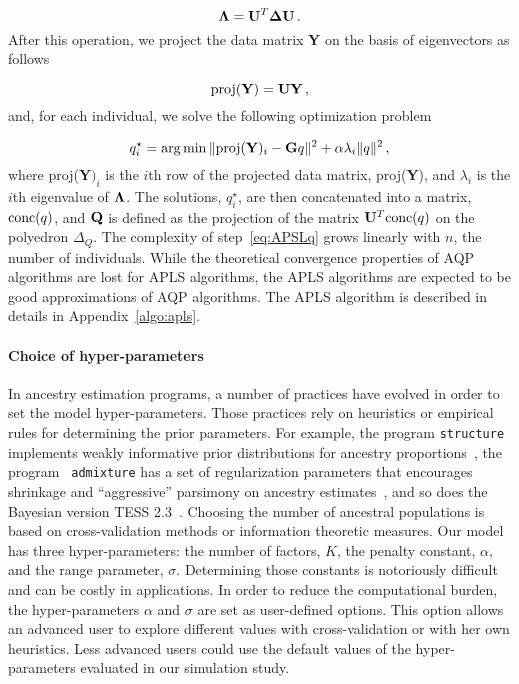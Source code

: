 $$
{\bf \Lambda} = {\bf U}^T {\bf \Delta} {\bf U} \, .
$$
\noindent  After this operation, we project the data matrix {\bf Y} on the basis of eigenvectors as follows

$$
{\rm proj} ({\bf Y}) = {\bf U}{\bf Y} \, , 
$$
\noindent and, for each individual, we solve the following optimization problem

\begin{equation}
q_i^\star = \arg \min  \|  {\rm proj} ({\bf Y})_i  - {\bf G} q \|^2 + \alpha \lambda_i \| q \|^2  \, ,
\label{eq:APSLq}
\end{equation}
\noindent where proj({\bf Y}$)_i$ is the $i$th row of the projected data matrix,
proj({\bf Y}), and $\lambda_i$ is the $i$th eigenvalue of ${\bf \Lambda}$. The
solutions, $q_i^\star$, are then concatenated into a matrix, ${\rm conc}(q)$, and
${\bf Q}$ is defined as the projection of the matrix ${\bf U}^T {\rm conc}(q)$
on the polyedron $\Delta_Q$. The complexity of step~\eqref{eq:APSLq} grows
linearly with $n$, the number of individuals. While the theoretical convergence
properties of AQP algorithms are lost for APLS algorithms, the APLS algorithms
are expected to be good approximations of AQP algorithms. The APLS algorithm is
described in details in Appendix~\ref{algo:apls}.


\paragraph{Choice of hyper-parameters} In ancestry estimation programs, a
number of practices have evolved in order to set the model hyper-parameters.
Those practices rely on heuristics or empirical rules for determining the prior
parameters. For example, the program {\tt structure} implements weakly informative
prior distributions for ancestry proportions~\citep{wang2017}, the program {\tt
  admixture} has a set of regularization parameters that encourages shrinkage
and “aggressive” parsimony on ancestry estimates~\citep{Alexander2011}, and so
does the Bayesian version TESS 2.3~\citep{Durand2009}. Choosing the number of
ancestral populations is based on cross-validation methods or information
theoretic measures. Our model has three hyper-parameters: the number of factors,
$K$, the penalty constant, $\alpha$, and the range parameter, $\sigma$.
Determining those constants is notoriously difficult and can be costly in
applications. In order to reduce the computational burden, the hyper-parameters
$\alpha$ and $\sigma$ are set as user-defined options. This option allows an
advanced user to explore different values with cross-validation or with her own
heuristics. Less advanced users could use the default values of the
hyper-parameters evaluated in our simulation study.
 


